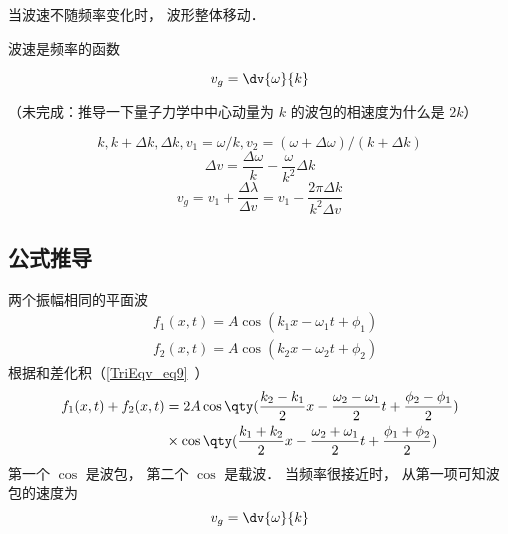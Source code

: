 
\begin{issues}
\issueDraft
\end{issues}


当波速不随频率变化时， 波形整体移动．

波速是频率的函数

\begin{equation}
v_g = \dv{\omega}{k}
\end{equation}

（未完成：推导一下量子力学中中心动量为 $k$ 的波包的相速度为什么是 $2k$）

\begin{equation}
k, k+\Delta k, \Delta k, v_1 = \omega/k, v_2 = (\omega+\Delta\omega)/(k+\Delta k)
\end{equation}
\begin{equation}
\Delta v = \frac{\Delta \omega}{k} - \frac{\omega}{k^2}\Delta k
\end{equation}
\begin{equation}
v_g = v_1 + \frac{\Delta \lambda}{\Delta v} = v_1 - \frac{2\pi\Delta k}{k^2\Delta v}
\end{equation}

\subsection{公式推导}
两个振幅相同的平面波
\begin{equation}
\begin{aligned}
&f_1(x,t) = A\cos(k_1 x - \omega_1 t + \phi_1)\\
&f_2(x,t) = A\cos(k_2 x - \omega_2 t + \phi_2)
\end{aligned}
\end{equation}
根据和差化积（\autoref{TriEqv_eq9}~）
\begin{equation}
\begin{aligned}
f_1(x,t) + f_2(x,t) &= 2 A \cos \qty(\frac{k_2-k_1}{2}x - \frac{\omega_2-\omega_1}{2}t + \frac{\phi_2 - \phi_1}{2})\\
& \times \cos \qty(\frac{k_1+k_2}{2}x - \frac{\omega_{2}+\omega_{1}}{2}t + \frac{\phi_1 + \phi_2}{2})
\end{aligned}
\end{equation}
第一个 $\cos$ 是波包， 第二个 $\cos$ 是载波． 当频率很接近时， 从第一项可知波包的速度为
\begin{equation}
v_g = \dv{\omega}{k}
\end{equation}
